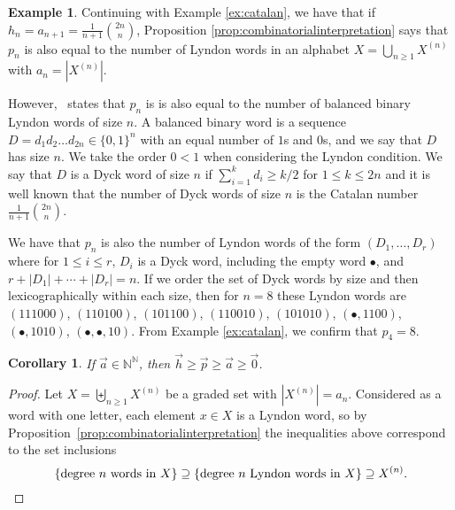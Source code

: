 \documentclass[11pt]{amsart}
\newtheorem{corollary}[theorem]{Corollary}
\theoremstyle{definition}
\newtheorem{example}[theorem]{Example}
\numberwithin{equation}{section}
\def\NN{{\mathbb N}}
\begin{document}
\begin{example}\label{ex:balancedLyndon}
Continuing with Example \ref{ex:catalan}, we have that if
$h_n = a_{n+1} = \frac{1}{n+1}\binom{2n}{n}$, Proposition
\ref{prop:combinatorialinterpretation} says that $p_n$ is also equal to the number
of Lyndon words in an alphabet $X = \bigcup_{n\geq1} X^{(n)}$ with $a_n = |X^{(n)}|$.

However,~\cite[A022553]{OEIS} states that $p_n$ is is also equal to the number of balanced binary Lyndon words of size $n$.  A balanced binary word is a sequence $D = d_1d_2\ldots d_{2n} \in \{0, 1\}^{n}$ with an equal number of $1$s and $0$s, and we say that $D$ has size $n$.  We take the order $0 < 1$ when considering the Lyndon condition.  
We say that $D$ is a Dyck word of size $n$ if $\sum_{i=1}^k d_i \geq k/2$ for $1 \leq k \leq 2n$
and it is well known that the number of Dyck words of size $n$ is the Catalan number $\frac{1}{n+1}\binom{2n}{n}$.  

We have that $p_n$ is also the number of Lyndon words of the form
$(D_1, \ldots, D_r)$ where for $1 \leq i \leq r$,
$D_i$ is a Dyck word, including the empty word $\bullet$, and $r+|D_1|+\cdots+|D_r| = n$.  
If we order the set of Dyck words by size and then lexicographically within each size, then for $n = 8$ these Lyndon words are
$(111000)$, $(110100)$, $(101100)$, $(110010)$, $(101010)$,
$(\bullet, 1100)$, $(\bullet, 1010)$, $(\bullet, \bullet, 10)$.
From Example \ref{ex:catalan}, we confirm that $p_4 = 8$.
\end{example}

\begin{corollary}
If $\vec{a} \in \NN^{\NN}$, then $\vec{h} \geq \vec{p} \geq \vec{a} \geq \vec{0}$.
\end{corollary}
\begin{proof}
Let $X = \biguplus_{n \ge 1} X^{(n)}$ be a graded set with $|X^{(n)}| = a_{n}$.  
Considered as a word with one letter, each element $x \in X$ is a Lyndon word, so by Proposition~\ref{prop:combinatorialinterpretation} the inequalities above correspond to the set inclusions
\[
\{\text{degree $n$ words in $X$}\} 
\supseteq \{\text{degree $n$ Lyndon words in $X$}\} 
\supseteq X^{(n)}. \qedhere
\]
\end{proof}
\end{document}
